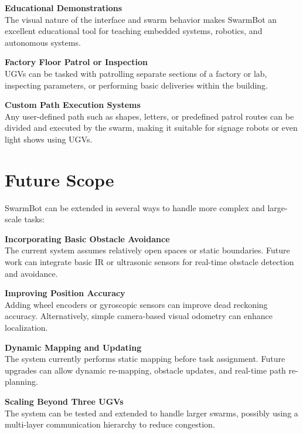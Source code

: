 \documentclass[a4paper,12pt]{report}
\begin{document}
\vspace{0.5cm}
\textbf{Educational Demonstrations} \\
The visual nature of the interface and swarm behavior makes SwarmBot an excellent educational tool for teaching embedded systems, robotics, and autonomous systems.

\vspace{0.5cm}
\textbf{Factory Floor Patrol or Inspection} \\
UGVs can be tasked with patrolling separate sections of a factory or lab, inspecting parameters, or performing basic deliveries within the building.

\vspace{0.5cm}
\textbf{Custom Path Execution Systems} \\
Any user-defined path such as shapes, letters, or predefined patrol routes can be divided and executed by the swarm, making it suitable for signage robots or even light shows using UGVs.


\chapter{Future Scope}

SwarmBot can be extended in several ways to handle more complex and large-scale tasks:

\vspace{0.5cm}
\textbf{Incorporating Basic Obstacle Avoidance} \\
The current system assumes relatively open spaces or static boundaries. Future work can integrate basic IR or ultrasonic sensors for real-time obstacle detection and avoidance.

\vspace{0.5cm}
\textbf{Improving Position Accuracy} \\
Adding wheel encoders or gyroscopic sensors can improve dead reckoning accuracy. Alternatively, simple camera-based visual odometry can enhance localization.

\vspace{0.5cm}
\textbf{Dynamic Mapping and Updating} \\
The system currently performs static mapping before task assignment. Future upgrades can allow dynamic re-mapping, obstacle updates, and real-time path re-planning.

\vspace{0.5cm}
\textbf{Scaling Beyond Three UGVs} \\
The system can be tested and extended to handle larger swarms, possibly using a multi-layer communication hierarchy to reduce congestion.
\end{document}

